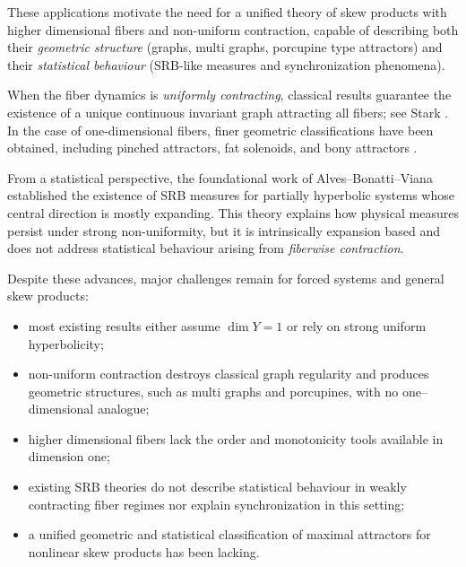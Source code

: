 \documentclass[11pt,reqno]{amsart}
\theoremstyle{plain}
\newtheorem*{theorem A}{Theorem A}
\newtheorem*{theorem B}{Theorem B}
\newtheorem*{theorem C}{Theorem C}
\newtheorem*{theorem 1}{Theorem 1}
\newtheorem*{theorem 2}{Theorem 2}
\newtheorem*{theorem 3}{Theorem 3}
\numberwithin{equation}{section}
\begin{document}
These applications motivate the need for a unified theory of skew products with
higher dimensional fibers and non-uniform contraction, capable of describing both their
\emph{geometric structure} (graphs, multi graphs, porcupine type attractors) and their
\emph{statistical behaviour} (SRB-like measures and synchronization phenomena).


When the fiber dynamics is \emph{uniformly contracting}, classical results guarantee the
existence of a unique continuous invariant graph attracting all fibers; see Stark
\cite{stark1999regularity}.
In the case of one-dimensional fibers, finer geometric classifications have been obtained,
including pinched attractors, fat solenoids, and bony attractors
\cite{jager2003quasiperiodically,tsujii2001fat,kudryashov2010bony}.

From a statistical perspective, the foundational work of Alves--Bonatti--Viana
\cite{alves2000srb}
established the existence of SRB measures for partially hyperbolic systems whose central
direction is mostly expanding.
This theory explains how physical measures persist under strong non-uniformity, but it is
intrinsically expansion based and does not address statistical behaviour arising from
\emph{fiberwise contraction}.

Despite these advances, major challenges remain for forced systems and general skew products:

\begin{itemize}
\item most existing results either assume $\dim Y=1$ or rely on strong uniform hyperbolicity;
\item non-uniform contraction destroys classical graph regularity and produces geometric
structures, such as multi graphs and porcupines, with no one--dimensional analogue;
\item higher dimensional fibers lack the order and monotonicity tools available in dimension
one;
\item existing SRB theories do not describe statistical behaviour in weakly contracting fiber
regimes nor explain synchronization in this setting;
\item a unified geometric and statistical classification of maximal attractors for nonlinear skew
products has been lacking.
\end{itemize}
\end{document}
